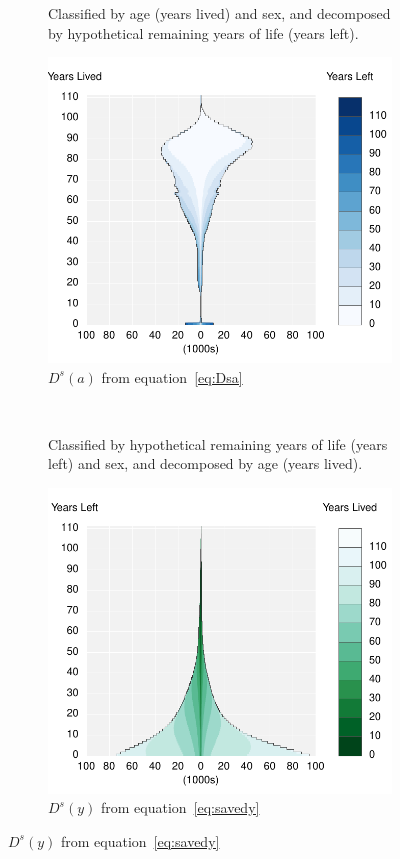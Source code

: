 \documentclass{article}
\begin{document}
\begin{figure}
\centering
\caption{US, 2010 potentially saveable lives (Deaths)}
\label{fig:1}
\begin{subfigure}[b]{.48\linewidth}
\centering
	\caption{Classified by age (years lived) and sex, and decomposed
by hypothetical remaining years of life (years left).}
	\label{fig:Day}
	\includegraphics[scale=.55]{Figures/Deathsxy10.pdf}	
	\caption*{$D^s(a)$ from equation~\eqref{eq:Dsa}}
\end{subfigure}
~
\begin{subfigure}[b]{.48\linewidth}
\centering
    \caption{Classified by hypothetical remaining years of life
(years left) and sex, and decomposed by age (years lived).}
	\label{fig:Dya}
    \includegraphics[scale=.55]{Figures/Deathsyx10.pdf}
    \caption*{$D^s(y)$ from equation~\eqref{eq:savedy}}
\end{subfigure}
\end{figure}
\end{document}
